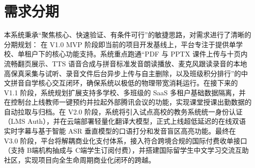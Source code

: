\section{需求分期}
本系统秉承“聚焦核心、快速验证、有条件可行”的敏捷思路，对需求进行了清晰的分期规划：
在 V1.0 MVP 阶段即当前的项目开发基线上，平台专注于提供单学校、单租户下的核心功能支持。系统重点跑通“PDF 与 PPTX 课件上传与十页内流畅翻页展示、TTS 语音合成与拼音标准发音朗读播放、麦克风跟读录音的本地高保真采集与试听、录音文件后台异步上传与自主删除，以及班级积分排行”的中文拼音自学核心交互闭环，确保系统以极低的物理带宽消耗运行。在接下来的 V1.1 阶段，系统规划扩展支持多学校、多班级的 SaaS 多租户基础数据隔离，并在控制台上线教师一键预约并拉起外部腾讯会议的功能，实现课堂授课出勤数据的自动拉取与归档。在 V2.0 阶段，系统将引入试点高校的教务系统统一身份认证（LMS Auth），并在云端部署轻量化翻译大模型，正式上线超低延迟的在线双语实时字幕与基于智能 ASR 垂直模型的口语打分和发音盲区高亮功能。最终在 V3.0 阶段，平台将解耦商业化支付体系，接入符合跨境合规的国际付费收单接口（支持 B端机构抽成与 C端学生订阅付费），并搭建国际留学生中文学习交流互助社区，实现项目向全生命周期商业化闭环的跨越。

